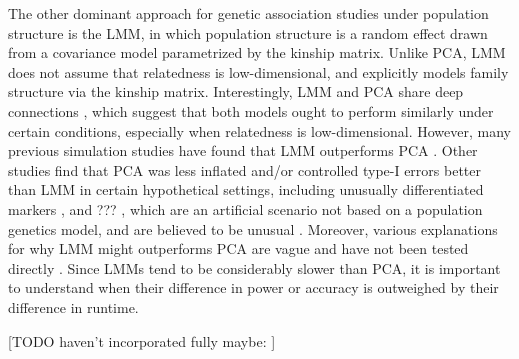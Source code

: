 \documentclass[11pt]{article}
\begin{document}
The other dominant approach for genetic association studies under population structure is the LMM, in which population structure is a random effect drawn from a covariance model parametrized by the kinship matrix.
Unlike PCA, LMM does not assume that relatedness is low-dimensional, and explicitly models family structure via the kinship matrix.
Interestingly, LMM and PCA share deep connections \citep{astle_population_2009, hoffman_correcting_2013}, which suggest that both models ought to perform similarly under certain conditions, especially when relatedness is low-dimensional.
However, many previous simulation studies have found that LMM outperforms PCA \citep{
  zhao_arabidopsis_2007,
  astle_population_2009,
  kang_variance_2010,
  wu_comparison_2011, %
  song_testing_2015}.
Other studies find that PCA was less inflated and/or controlled type-I errors better than LMM in certain hypothetical settings, including unusually differentiated markers \citep{price_new_2010, wu_comparison_2011}, and ??? \citep{wang_analytical_2013}, which are an artificial scenario not based on a population genetics model, and are believed to be unusual \citep{sul_mixed_2013}.
Moreover, various explanations for why LMM might outperforms PCA are vague and have not been tested directly \citep{price_new_2010, sul_mixed_2013, price_response_2013, hoffman_correcting_2013}.
Since LMMs tend to be considerably slower than PCA, it is important to understand when their difference in power or accuracy is outweighed by their difference in runtime.

[TODO haven't incorporated fully maybe: \citep{thornton_roadtrips:_2010}]
\end{document}
